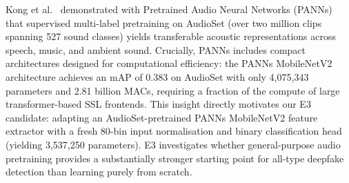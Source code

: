 Kong et al.~\cite{kong2020panns} demonstrated with Pretrained Audio Neural Networks (PANNs) that supervised multi-label pretraining on AudioSet (over two million clips spanning 527 sound classes) yields transferable acoustic representations across speech, music, and ambient sound. Crucially, PANNs includes compact architectures designed for computational efficiency: the PANNs MobileNetV2 architecture achieves an mAP of 0.383 on AudioSet with only 4,075,343 parameters and 2.81 billion MACs, requiring a fraction of the compute of large transformer-based SSL frontends. This insight directly motivates our E3 candidate: adapting an AudioSet-pretrained PANNs MobileNetV2 feature extractor with a fresh 80-bin input normalisation and binary classification head (yielding 3,537,250 parameters). E3 investigates whether general-purpose audio pretraining provides a substantially stronger starting point for all-type deepfake detection than learning purely from scratch.

